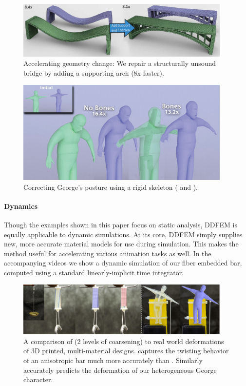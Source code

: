 \begin{figure}
	\centering
	\includegraphics[width=0.95\textwidth]{images/bridge}
	\caption{Accelerating geometry change: We repair a structurally unsound bridge by adding a supporting arch (8x faster).}
	\label{fig:bridge}
\end{figure}
\begin{figure}
	\centering
	\includegraphics[width=0.95\textwidth]{images/georgeUpdate.png}
	\caption{Correcting George's posture using a rigid skeleton ({\HiRes} and {\DDFEM}).}
	\label{fig:george}
\end{figure}
\paragraph{Dynamics} Though the examples shown in this paper focus on static analysis, DDFEM is equally applicable to dynamic simulations. At its core, DDFEM simply supplies new, more accurate material models for use during simulation. This makes the method useful for accelerating various animation tasks as well. In the accompanying videos we show a dynamic simulation of our fiber embedded bar, computed using a standard linearly-implicit time integrator.

\begin{figure}
	\includegraphics[width=0.95\textwidth]{images/experiments.jpg}
	\caption{A comparison of  {\DDFEM} (2 levels of coarsening) to real world deformations of 3D printed, multi-material designs. {\DDFEM} captures the twisting behavior of an anisotropic bar much more accurately than {\Naive}. Similarly {\DDFEM} accurately predicts the deformation of our heterogeneous George character. }
	\label{fig:experiments}
\end{figure}

